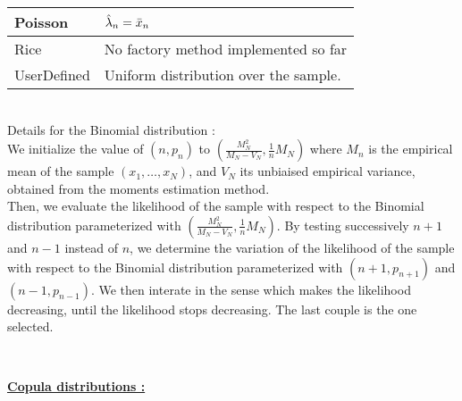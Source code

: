 {  \begin{tabular}{|l|p{12cm}|}
    \hline
    Poisson & $\displaystyle\Hat{\lambda}_n = \bar{x}_n$\\
    \hline
    Rice   & No factory method implemented so far\\
    \hline
    UserDefined & Uniform distribution over the sample.\\
    \hline
  \end{tabular}\rule{0pt}{1em}\\


  Details for the Binomial distribution : \\
  We initialize the value of $(n,p_n)$ to $(\displaystyle \frac{M_N^2}{M_N-V_N}, \displaystyle \frac{1}{n}M_N)$ where $M_n$ is the empirical mean of the sample $(x_1, \hdots, x_N)$, and $V_N$ its unbiaised empirical variance, obtained from the moments estimation method.\\
  Then, we evaluate the likelihood of the sample with respect to the Binomial distribution parameterized with $(\displaystyle \frac{M_N^2}{M_N-V_N}, \displaystyle \frac{1}{n}M_N)$. By testing successively $n+1$ and $n-1$ instead of $n$, we determine the variation of the likelihood of  the sample  with respect to the Binomial distribution parameterized with  $(n+1,p_{n+1})$ and $(n-1,p_{n-1})$. We then interate in the sense which makes the likelihood decreasing, until the likelihood stops decreasing. The last couple is the one selected.\rule{0pt}{1em}\\


  \newpage

  \underline{\textbf{Copula distributions :}}\\

}
